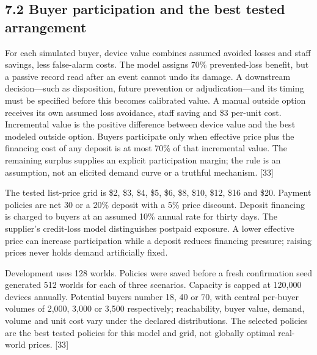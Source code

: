 \documentclass[
  11pt,
]{article}
\begin{document}
\hypertarget{buyer-participation-and-the-best-tested-arrangement}{%
\subsection{7.2 Buyer participation and the best tested
arrangement}\label{buyer-participation-and-the-best-tested-arrangement}}

For each simulated buyer, device value combines assumed avoided losses
and staff savings, less false-alarm costs. The model assigns 70\%
prevented-loss benefit, but a passive record read after an event cannot
undo its damage. A downstream decision---such as disposition, future
prevention or adjudication---and its timing must be specified before
this becomes calibrated value. A manual outside option receives its own
assumed loss avoidance, staff saving and \$3 per-unit cost. Incremental
value is the positive difference between device value and the best
modeled outside option. Buyers participate only when effective price
plus the financing cost of any deposit is at most 70\% of that
incremental value. The remaining surplus supplies an explicit
participation margin; the rule is an assumption, not an elicited demand
curve or a truthful mechanism. {[}33{]}

The tested list-price grid is \$2, \$3, \$4, \$5, \$6, \$8, \$10, \$12,
\$16 and \$20. Payment policies are net 30 or a 20\% deposit with a 5\%
price discount. Deposit financing is charged to buyers at an assumed
10\% annual rate for thirty days. The supplier's credit-loss model
distinguishes postpaid exposure. A lower effective price can increase
participation while a deposit reduces financing pressure; raising prices
never holds demand artificially fixed.

Development uses 128 worlds. Policies were saved before a fresh
confirmation seed generated 512 worlds for each of three scenarios.
Capacity is capped at 120,000 devices annually. Potential buyers number
18, 40 or 70, with central per-buyer volumes of 2,000, 3,000 or 3,500
respectively; reachability, buyer value, demand, volume and unit cost
vary under the declared distributions. The selected policies are the
best tested policies for this model and grid, not globally optimal
real-world prices. {[}33{]}
\end{document}
